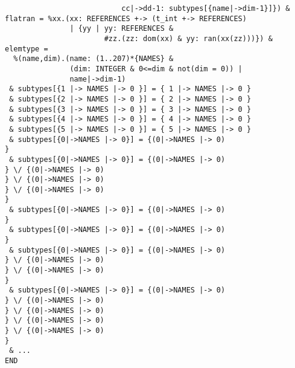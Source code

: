 \begin{verbatim}
                           cc|->dd-1: subtypes[{name|->dim-1}]}) & 
flatran = %xx.(xx: REFERENCES +-> (t_int +-> REFERENCES) 
               | {yy | yy: REFERENCES & 
                       #zz.(zz: dom(xx) & yy: ran(xx(zz)))}) & 
elemtype = 
  %(name,dim).(name: (1..207)*{NAMES} & 
               (dim: INTEGER & 0<=dim & not(dim = 0)) | 
               name|->dim-1)
 & subtypes[{1 |-> NAMES |-> 0 }] = { 1 |-> NAMES |-> 0 }
 & subtypes[{2 |-> NAMES |-> 0 }] = { 2 |-> NAMES |-> 0 }
 & subtypes[{3 |-> NAMES |-> 0 }] = { 3 |-> NAMES |-> 0 }
 & subtypes[{4 |-> NAMES |-> 0 }] = { 4 |-> NAMES |-> 0 }
 & subtypes[{5 |-> NAMES |-> 0 }] = { 5 |-> NAMES |-> 0 }
 & subtypes[{0|->NAMES |-> 0}] = {(0|->NAMES |-> 0)
}
 & subtypes[{0|->NAMES |-> 0}] = {(0|->NAMES |-> 0)
} \/ {(0|->NAMES |-> 0)
} \/ {(0|->NAMES |-> 0)
} \/ {(0|->NAMES |-> 0)
}
 & subtypes[{0|->NAMES |-> 0}] = {(0|->NAMES |-> 0)
}
 & subtypes[{0|->NAMES |-> 0}] = {(0|->NAMES |-> 0)
}
 & subtypes[{0|->NAMES |-> 0}] = {(0|->NAMES |-> 0)
} \/ {(0|->NAMES |-> 0)
} \/ {(0|->NAMES |-> 0)
}
 & subtypes[{0|->NAMES |-> 0}] = {(0|->NAMES |-> 0)
} \/ {(0|->NAMES |-> 0)
} \/ {(0|->NAMES |-> 0)
} \/ {(0|->NAMES |-> 0)
} \/ {(0|->NAMES |-> 0)
}
 & ...
END
 \end{verbatim}
